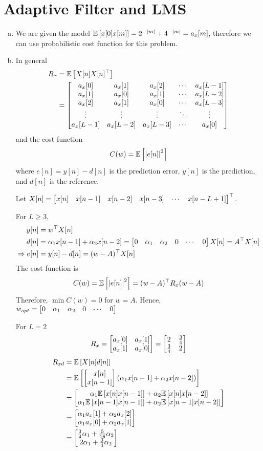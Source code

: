 \section{Adaptive Filter and LMS}\label{sec:p3}

\begin{enumerate}[(a)]
\item We are given the model $\mathbb{E} \left[ x[0]x[m] \right] = 2^{-\left\lvert m \right\rvert} + 4^{-\left\lvert m \right\rvert} = a_x[m]$, therefore we can use probabilistic cost function for this problem.

\item 
In general
\begin{align*}
	R_x
	&= \mathbb{E} \left[ X[n] X[n]^\top \right] \\
	&= \begin{bmatrix} 
		a_x[0] & a_x[1] & a_x[2] & \cdots & a_x[L-1] \\
		a_x[1] & a_x[0] & a_x[1] & \cdots & a_x[L-2] \\
		a_x[2] & a_x[1] & a_x[0] & \cdots & a_x[L-3] \\
		\vdots & \vdots & \vdots & \ddots & \vdots \\
		a_x[L-1] & a_x[L-2] & a_x[L-3] & \cdots & a_x[0]
		 \end{bmatrix}
\end{align*}
and the cost function
\[C(w) = \mathbb{E} \left[ \left\lvert e[n] \right\rvert^2 \right]\]
where $e[n] = y[n] - d[n]$ is the prediction error, $y[n]$ is the prediction, and $d[n]$ is the reference.

Let $X[n] = \begin{bmatrix} x[n] & x[n-1] & x[n-2] & x[n-3] & \cdots & x[n-L+1] \end{bmatrix}^\top$.

For $L \geq 3$,
\begin{align*}
	y[n] &= w^\top X[n] \\
	d[n] &= \alpha_1 x[n-1] + \alpha_2 x[n-2] = \begin{bmatrix} 0 & \alpha_1 & \alpha_2 & 0 & \cdots & 0 \end{bmatrix} X[n] = A^\top X[n] \\
	\Rightarrow e[n] &= y[n] - d[n] = (w - A)^\top X[n]
\end{align*}
The cost function is
\[C(w) = \mathbb{E} \left[ \left\lvert e[n] \right\rvert^2 \right] = (w-A)^\top R_x (w-A)\]
Therefore, $\min C(w) = 0$ for $w = A$. Hence, $w_{opt} = \begin{bmatrix} 0 & \alpha_1 & \alpha_2 & 0 & \cdots & 0 \end{bmatrix}$

For $L = 2$
\[R_x = \begin{bmatrix} a_x[0] & a_x[1] \\ a_x[1] & a_x[0] \end{bmatrix} = \begin{bmatrix} 2 & \frac{3}{4} \\ \frac{3}{4} & 2 \end{bmatrix}\]
\begin{align*}
	R_{xd}
	&= \mathbb{E} \left[ X[n]d[n] \right] \\
	&= \mathbb{E} \left[ \begin{bmatrix} x[n] \\ x[n-1] \end{bmatrix}(\alpha_1 x[n-1] + \alpha_2 x[n-2]) \right] \\
	&= \begin{bmatrix} \alpha_1\mathbb{E} \left[ x[n]x[n-1] \right] + \alpha_2\mathbb{E} \left[ x[n]x[n-2] \right] \\ \alpha_1\mathbb{E} \left[ x[n-1]x[n-1] \right] + \alpha_2\mathbb{E} \left[ x[n-1]x[n-2] \right] \end{bmatrix} \\
	&= \begin{bmatrix} \alpha_1 a_x[1] + \alpha_2 a_x[2] \\ \alpha_1 a_x[0] + \alpha_2 a_x[1] \end{bmatrix} \\
	&= \begin{bmatrix} \frac{3}{4}\alpha_1 + \frac{5}{16}\alpha_2 \\ 2\alpha_1 + \frac{3}{4}\alpha_2 \end{bmatrix}
\end{align*}


\end{enumerate}

